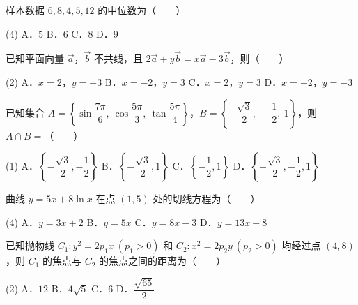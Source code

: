 \begin{question}
样本数据 $6,8,4,5,12$ 的中位数为\mbox{（　　）}

\begin{gkopts}(4)
\task A．$5$
\task B．$6$
\task C．$8$
\task D．$9$
\end{gkopts}

\end{question}
\begin{question}
已知平面向量 $\vec{a}$，$\vec{b}$ 不共线，且 $2\vec{a}+y\vec{b}=x\vec{a}-3\vec{b}$，则\mbox{（　　）}

\begin{gkopts}(2)
\task A．$x=2$，$y=-3$
\task B．$x=-2$，$y=3$
\task C．$x=2$，$y=3$
\task D．$x=-2$，$y=-3$
\end{gkopts}

\end{question}
\begin{question}
已知集合 $A=\left\{\sin\dfrac{7\pi}{6},\ \cos\dfrac{5\pi}{3},\ \tan\dfrac{5\pi}{4}\right\}$，$B=\left\{-\dfrac{\sqrt{3}}{2},\ -\dfrac{1}{2},\ 1\right\}$，则 $A\cap B=$\mbox{（　　）}

\begin{gkopts}(1)
\task A．$\left\{-\dfrac{\sqrt{3}}{2},-\dfrac{1}{2}\right\}$
\task B．$\left\{-\dfrac{\sqrt{3}}{2},1\right\}$
\task C．$\left\{-\dfrac{1}{2},1\right\}$
\task D．$\left\{-\dfrac{\sqrt{3}}{2},-\dfrac{1}{2},1\right\}$
\end{gkopts}

\end{question}
\begin{question}
曲线 $y=5x+8\ln x$ 在点 $(1,5)$ 处的切线方程为\mbox{（　　）}

\begin{gkopts}(4)
\task A．$y=3x+2$
\task B．$y=5x$
\task C．$y=8x-3$
\task D．$y=13x-8$
\end{gkopts}

\end{question}
\begin{question}
已知抛物线 $C_1:y^2=2p_1x\ (p_1>0)$ 和 $C_2:x^2=2p_2y\ (p_2>0)$ 均经过点 $(4,8)$，则 $C_1$ 的焦点与 $C_2$ 的焦点之间的距离为\mbox{（　　）}

\begin{gkopts}(2)
\task A．$12$
\task B．$4\sqrt{5}$
\task C．$6$
\task D．$\dfrac{\sqrt{65}}{2}$
\end{gkopts}

\end{question}
